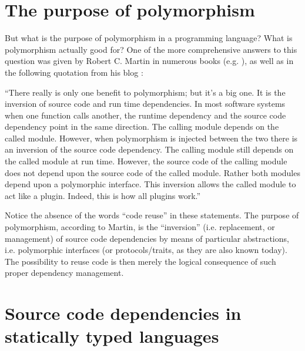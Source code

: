 \documentclass[11pt,oneside]{report}
\begin{document}
\section{The purpose of polymorphism}

But what is the purpose of polymorphism in a programming language?
What is polymorphism actually good for? One of the more comprehensive
answers to this question was given by Robert C. Martin in numerous
books (e.g. \cite{Martin_17}), as well as in the following quotation
from his blog \cite{Martin_14}:

\begin{displayquote}
``There really is only one benefit to polymorphism; but it's a big
  one. It is the inversion of source code and run time
  dependencies. In most software systems when one function calls
  another, the runtime dependency and the source code dependency point
  in the same direction. The calling module depends on the called
  module. However, when polymorphism is injected between the two there
  is an inversion of the source code dependency. The calling module
  still depends on the called module at run time. However, the source
  code of the calling module does not depend upon the source code of
  the called module. Rather both modules depend upon a polymorphic
  interface. This inversion allows the called module to act like a
  plugin. Indeed, this is how all plugins work.''
\end{displayquote}

Notice the absence of the words ``code reuse'' in these statements.
The purpose of polymorphism, according to Martin, is the ``inversion''
(i.e. replacement, or management) of source code dependencies by
means of particular abstractions, i.e. polymorphic interfaces (or
protocols/traits, as they are also known today). The possibility to
reuse code is then merely the logical consequence of such proper
dependency management.

\section{Source code dependencies in statically typed languages}
\end{document}
